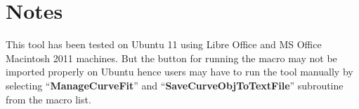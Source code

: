 \section{Notes}\label{notes}

This tool has been tested on Ubuntu 11 using Libre Office and MS Office Macintosh 2011 machines. But the button for running the macro may not be imported properly on Ubuntu hence users may have to run the tool manually by selecting ``\textbf{ManageCurveFit}'' and ``\textbf{SaveCurveObjToTextFile}'' subroutine from the macro list.
